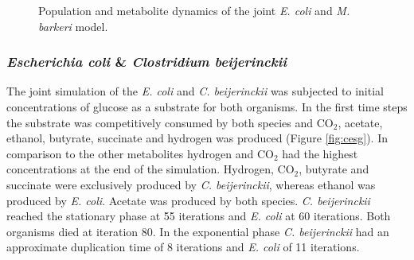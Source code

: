 \begin{figure}[h!]
{\begin{minipage}[t]{0.3\textwidth}
  \end{minipage}
  }
  \caption{Population and metabolite dynamics of the joint \emph{E. coli} and \emph{M. barkeri} model.}
  \label{fig:begrid}
\end{figure}

\subsubsection{\textit{Escherichia coli} \& \textit{Clostridium beijerinckii}}
The joint simulation of the \textit{E. coli} and \textit{C. beijerinckii} was subjected to initial concentrations of glucose as a substrate for both organisms. In the first time steps the substrate was competitively consumed by both species and CO$_2$, acetate, ethanol, butyrate, succinate and hydrogen was produced (Figure \hyperref[fig:cesg]{\ref{fig:cesg}}). In comparison to the other metabolites hydrogen and CO$_2$ had the highest concentrations at the end of the simulation. Hydrogen, CO$_2$, butyrate and succinate were exclusively produced by \textit{C. beijerinckii}, whereas ethanol was produced by \textit{E. coli}. Acetate was produced by both species. \textit{C. beijerinckii} reached the stationary phase at 55 iterations and \textit{E. coli} at 60 iterations. Both organisms died at iteration 80. In the exponential phase \textit{C. beijerinckii} had an approximate duplication time of 8 iterations and \textit{E. coli} of 11 iterations.

